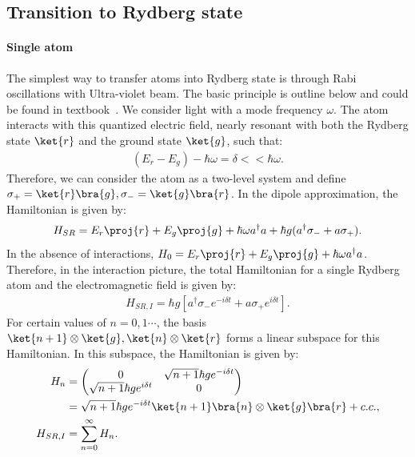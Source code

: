 \documentclass[11pt]{article}
\begin{document}
\subsection{Transition to Rydberg state\label{sec:light_atom_interaction}}

\paragraph{Single atom}
The simplest way to transfer atoms into Rydberg state is through Rabi oscillations with Ultra-violet beam. The basic principle is outline below and could be found in textbook~\cite{steck_optic_atoms}.
We consider light with a mode frequency $\omega$. The atom interacts with this quantized electric field, nearly resonant with both the Rydberg state $\ket{r}$ and the ground state $\ket{g}$, such that:
\begin{align}
    (E_r - E_g) -\hbar \omega = \delta << \hbar \omega.
\end{align}
Therefore, we can consider the atom as a two-level system and define $\sigma_+ = \ket{r} \bra{g}, \sigma_- = \ket{g}\bra{r}$. In the dipole approximation, the Hamiltonian is given by:
\begin{align}
    H_{SR} = E_r \proj{r} + E_g \proj{g} + \hbar \omega a^\dagger a+ \hbar  g (a^\dagger \sigma_{-}  + a \sigma_{+}).
\end{align}
In the absence of interactions, $H_0 = E_r \proj{r} + E_g \proj{g} + \hbar \omega a^\dagger a$. Therefore, in the interaction picture, the total Hamiltonian for a single Rydberg atom and the electromagnetic field is given by:
\begin{align}
    H_{SR,I} =\hbar  g [a^\dagger \sigma_{-} e^{-i\delta t} + a \sigma_{+}e^{i\delta t} ].
\end{align}
For certain values of $n = 0,1 \cdots$, the basis ${\ket{n+1}\otimes \ket{g}, \ket{n} \otimes \ket{r}}$ forms a linear subspace for this Hamiltonian. In this subspace, the Hamiltonian is given by:
\begin{align}
    H_n &= 
    \begin{pmatrix}
        0 & \sqrt{n + 1} \hbar g e^{-i\delta t} \\
        \sqrt{n + 1} \hbar g e^{i\delta t} & 0 
    \end{pmatrix} \\
    &=\sqrt{n + 1} \hbar g e^{-i\delta t} \ket{n+1} \bra{n}\otimes \ket{g}\bra{r} + c.c. ,\\
    H_{SR,I} &= \sum_{n = 0}^{\infty} H_n.
\end{align}
\end{document}
